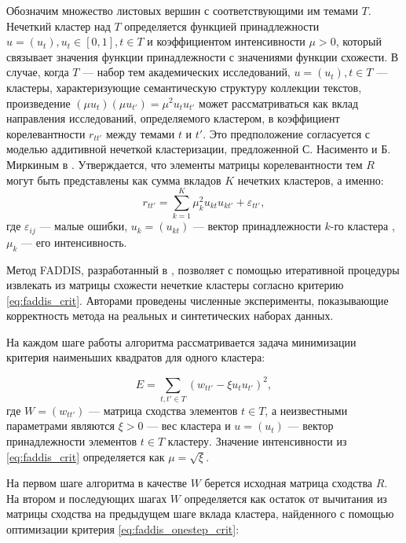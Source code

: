 \documentclass[12pt]{article}
\renewcommand{\epsilon}{\varepsilon}
\begin{document}
Обозначим множество листовых вершин с соответствующими им темами $T$. Нечеткий кластер над $T$ определяется функцией принадлежности $u=(u_t), u_t\in[0,1], t\in T$ и коэффициентом интенсивности $\mu>0$, который связывает значения функции принадлежности с значениями функции схожести. В случае, когда $T$ --- набор тем академических исследований, $u=(u_t), t\in T$ --- кластеры, характеризующие семантическую структуру коллекции текстов, произведение $(\mu u_t)(\mu u_{t'}) = \mu^2u_tu_{t'}$ может рассматриваться как вклад направления исследований, определяемого кластером, в коэффициент корелевантности $r_{tt'}$ между темами $t$ и $t'$. Это предположение согласуется с моделью аддитивной нечеткой кластеризации, предложенной С. Насименто и Б. Миркиным в \cite{mirkin2009analysis}. Утверждается, что элементы матрицы корелевантности тем $R$ могут быть представлены как сумма вкладов $K$ нечетких кластеров, а именно:
\begin{equation}
	r_{tt'}=\sum_{k=1}^{K}\mu_k^2u_{kt}u_{kt'} + \epsilon_{tt'},
	\label{eq:faddis_crit}
\end{equation}
где $\epsilon_{ij}$ --- малые ошибки, $u_k=(u_{kt})$ --- вектор принадлежности $k$-го кластера , $\mu_k$ --- его интенсивность. 

Метод FADDIS, разработанный в \cite{mirkin2009analysis, mirkin2012additive, nascimento2013laplacian}, позволяет с помощью итеративной процедуры извлекать из матрицы схожести нечеткие кластеры согласно критерию \eqref{eq:faddis_crit}. Авторами проведены численные эксперименты, показывающие корректность метода на реальных и синтетических наборах данных.

На каждом шаге работы алгоритма рассматривается задача минимизации критерия наименьших квадратов для одного кластера:

\begin{equation}
	E=\sum_{t,t'\in T}(w_{tt'}-\xi u_t u_{t'})^2,
	\label{eq:faddis_onestep_crit}
\end{equation}
где $W=(w_{tt'})$ --- матрица сходства элементов $t\in T$, а неизвестными параметрами являются $\xi>0$ --- вес кластера и $u=(u_t)$ --- вектор принадлежности элементов $t\in T$ кластеру. Значение интенсивности из \eqref{eq:faddis_crit} определяется как $\mu=\sqrt{\xi}$.

На первом шаге алгоритма в качестве $W$ берется исходная матрица сходства $R$. На втором и последующих шагах $W$ определяется как остаток от вычитания из матрицы сходства на предыдущем шаге вклада кластера, найденного с помощью оптимизации критерия \eqref{eq:faddis_onestep_crit}:
\end{document}
